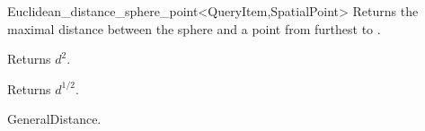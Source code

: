 \begin{ccRefClass}{Euclidean_distance_sphere_point<QueryItem,SpatialPoint>}
{Returns the maximal distance between the sphere  and
a point from  furthest to .}

 {Returns $d^2$.}

 {Returns $d^{1/2}$.}


\ccSeeAlso

GeneralDistance.



\end{ccRefClass}


